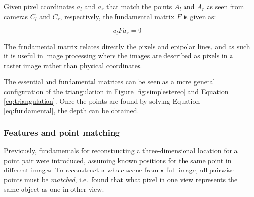 Given pixel coordinates $a_l$ and $a_r$ that match the points $A_l$ and $A_r$ as seen from cameras $C_l$ and $C_r$, respectively, the fundamental matrix $F$ is given as:

\begin{equation} \label{eq:fundamental}
	a_l F a_r = 0
\end{equation}


%
%
%
%

The fundamental matrix relates directly the pixels and epipolar lines, and as such it is useful in image processing where the images are described as pixels in a raster image rather than physical coordinates.

The essential and fundamental matrices can be seen as a more general configuration of the triangulation in Figure \ref{fig:simplestereo} and Equation \ref{eq:triangulation}.
Once the points are found by solving Equation \ref{eq:fundamental}, the depth can be obtained.
\cite{hartley03multiview}



\subsubsection{Features and point matching} %


Previously, fundamentals for reconstructing a three-dimensional location for a point pair were introduced, assuming known positions for the same point in different images.
To reconstruct a whole scene from a full image, all pairwise points must be \emph{matched}, i.e.\ found that what pixel in one view represents the same object as one in other view.
\cite[ch. 4]{szeliski10vision}

